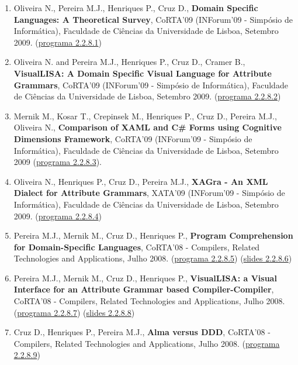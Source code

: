 \documentclass[11pt]{article}
\begin{document}
\begin{enumerate}

\item {Oliveira N., Pereira M.J., Henriques P., Cruz D., {\bf{ Domain Specific Languages: A Theoretical Survey}}, CoRTA'09 (INForum'09 - Simpósio de Informática), Faculdade de Ciências da Universidade de Lisboa, Setembro 2009. (\href{run:ComunicacoesOrais/programas/INForum2009.pdf}{programa 2.2.8.1})}

\item {Oliveira N. and Pereira M.J., Henriques P., Cruz D., Cramer B., {\bf{ VisualLISA: A Domain Specific Visual Language for Attribute Grammars}}, CoRTA'09 (INForum'09 - Simpósio de Informática), Faculdade de Ciências da Universidade de Lisboa, Setembro 2009. (\href{run:ComunicacoesOrais/programas/INForum2009.pdf}{programa 2.2.8.2})}

\item {Mernik M., Kosar T., Crepinsek M., Henriques P., Cruz D., Pereira M.J., Oliveira N., {\bf{ Comparison of XAML and C\# Forms using Cognitive Dimensions Framework}}, CoRTA'09 (INForum'09 - Simpósio de Informática), Faculdade de Ciências da Universidade de Lisboa, Setembro 2009 (\href{run:ComunicacoesOrais/programas/INForum2009.pdf}{programa 2.2.8.3}).}

\item {Oliveira N., Henriques P., Cruz D., Pereira M.J., {\bf{ XAGra - An XML Dialect for Attribute Grammars}}, XATA'09 (INForum'09 - Simpósio de Informática), Faculdade de Ciências da Universidade de Lisboa, Setembro 2009. (\href{run:ComunicacoesOrais/programas/INForum2009.pdf}{programa 2.2.8.4}) }

\item {Pereira M.J., Mernik M., Cruz D., Henriques P., {\bf{ Program Comprehension for Domain-Specific Languages}}, CoRTA'08 - Compilers, Related Technologies and Applications, Julho 2008. (\href{run:ComunicacoesOrais/programas/CoRTA08prog.pdf}{programa 2.2.8.5}) (\href{run:ComunicacoesOrais/Corta08DSLapres.pdf}{slides 2.2.8.6})}

\item {Pereira M.J., Mernik M., Cruz D., Henriques P., {\bf{ VisualLISA: a Visual Interface for an Attribute Grammar based Compiler-Compiler}}, CoRTA'08 - Compilers, Related Technologies and Applications, Julho 2008. (\href{run:ComunicacoesOrais/programas/CoRTA08prog.pdf}{programa 2.2.8.7}) (\href{run:ComunicacoesOrais/Corta08VLapres.pdf}{slides 2.2.8.8})}

\item {Cruz D., Henriques P., Pereira M.J., {\bf{ Alma versus DDD}}, CoRTA'08 - Compilers, Related Technologies and Applications, Julho 2008. (\href{run:ComunicacoesOrais/programas/CoRTA08prog.pdf}{programa 2.2.8.9})}


\end{enumerate}
\end{document}
